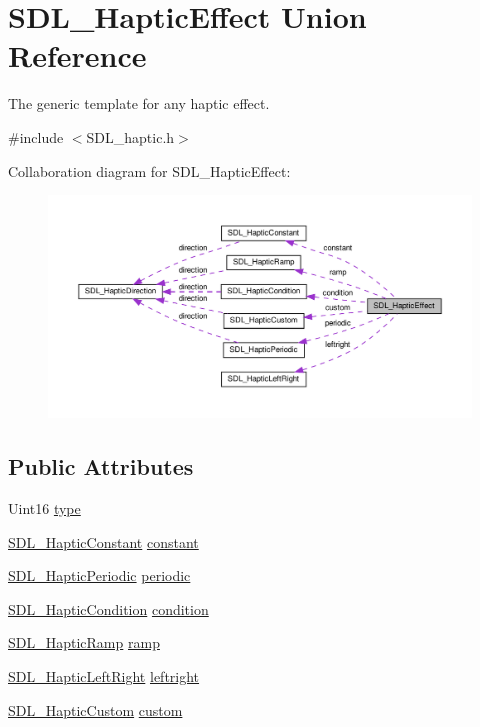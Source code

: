 \hypertarget{unionSDL__HapticEffect}{}\section{S\+D\+L\+\_\+\+Haptic\+Effect Union Reference}
\label{unionSDL__HapticEffect}


The generic template for any haptic effect.  




{\ttfamily \#include $<$S\+D\+L\+\_\+haptic.\+h$>$}



Collaboration diagram for S\+D\+L\+\_\+\+Haptic\+Effect\+:\nopagebreak
\begin{figure}[H]
\begin{center}
\leavevmode
\includegraphics[width=350pt]{unionSDL__HapticEffect__coll__graph}
\end{center}
\end{figure}
\subsection*{Public Attributes}
\begin{DoxyCompactItemize}
\item 
Uint16 \hyperlink{unionSDL__HapticEffect_a5ff6cfd8da91537091e9a6c2108cb179}{type}
\item 
\hyperlink{structSDL__HapticConstant}{S\+D\+L\+\_\+\+Haptic\+Constant} \hyperlink{unionSDL__HapticEffect_ac435275e9683d6cc5d65b9c7cc2ec659}{constant}
\item 
\hyperlink{structSDL__HapticPeriodic}{S\+D\+L\+\_\+\+Haptic\+Periodic} \hyperlink{unionSDL__HapticEffect_a8320ec4db6ec1dc1d30feb62ee2a2f04}{periodic}
\item 
\hyperlink{structSDL__HapticCondition}{S\+D\+L\+\_\+\+Haptic\+Condition} \hyperlink{unionSDL__HapticEffect_aa8fdd1ba202ccd7e61f48ef9977080d2}{condition}
\item 
\hyperlink{structSDL__HapticRamp}{S\+D\+L\+\_\+\+Haptic\+Ramp} \hyperlink{unionSDL__HapticEffect_a1d32ef4c2d1cc89dc938b392f6ad81bd}{ramp}
\item 
\hyperlink{structSDL__HapticLeftRight}{S\+D\+L\+\_\+\+Haptic\+Left\+Right} \hyperlink{unionSDL__HapticEffect_a3c254b81c1ff41c7888eee0cd0076a12}{leftright}
\item 
\hyperlink{structSDL__HapticCustom}{S\+D\+L\+\_\+\+Haptic\+Custom} \hyperlink{unionSDL__HapticEffect_a0b2d2af28c515cc39896b2b7c23019d2}{custom}
\end{DoxyCompactItemize}


